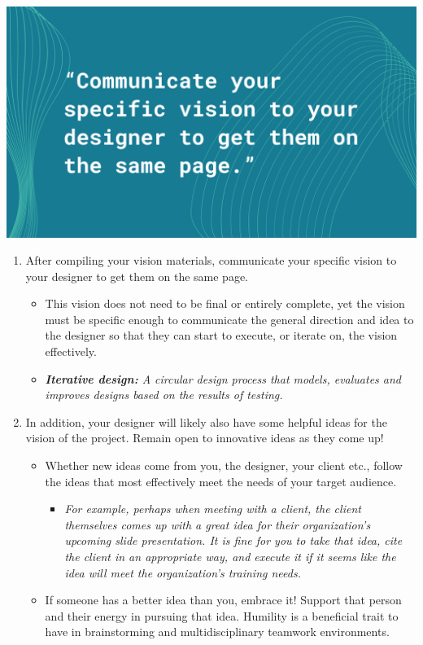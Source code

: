 \documentclass[
]{book}
\providecommand{\tightlist}{%
  \setlength{\itemsep}{0pt}\setlength{\parskip}{0pt}}
\begin{document}
\includegraphics{images/Working-With-Graphic-Designers-Quote-3.png}

\begin{enumerate}
\def\labelenumi{\arabic{enumi}.}
\setcounter{enumi}{2}
\tightlist
\item
  After compiling your vision materials, communicate your specific vision to your designer to get them on the same page.

  \begin{itemize}
  \tightlist
  \item
    This vision does not need to be final or entirely complete, yet the vision must be specific enough to communicate the general direction and idea to the designer so that they can start to execute, or iterate on, the vision effectively.
  \item
    \emph{\textbf{Iterative design:} A circular design process that models, evaluates and improves designs based on the results of testing.}
  \end{itemize}
\item
  In addition, your designer will likely also have some helpful ideas for the vision of the project. Remain open to innovative ideas as they come up!

  \begin{itemize}
  \tightlist
  \item
    Whether new ideas come from you, the designer, your client etc., follow the ideas that most effectively meet the needs of your target audience.

    \begin{itemize}
    \tightlist
    \item
      \emph{For example, perhaps when meeting with a client, the client themselves comes up with a great idea for their organization's upcoming slide presentation. It is fine for you to take that idea, cite the client in an appropriate way, and execute it if it seems like the idea will meet the organization's training needs.}
    \end{itemize}
  \item
    If someone has a better idea than you, embrace it! Support that person and their energy in pursuing that idea. Humility is a beneficial trait to have in brainstorming and multidisciplinary teamwork environments.
  \end{itemize}
\end{enumerate}
\end{document}
